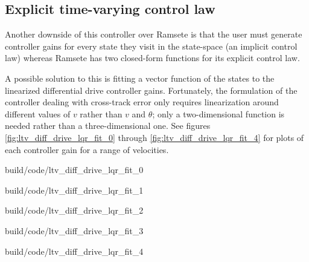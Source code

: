 \subsection{Explicit time-varying control law}

Another downside of this controller over Ramsete is that the user must generate
controller gains for every state they visit in the state-space (an implicit
control law) whereas Ramsete has two closed-form functions for its explicit
control law.

A possible solution to this is fitting a vector function of the states to the
linearized differential drive controller gains. Fortunately, the formulation of
the controller dealing with cross-track error only requires linearization around
different values of $v$ rather than $v$ and $\theta$; only a two-dimensional
function is needed rather than a three-dimensional one. See figures
\ref{fig:ltv_diff_drive_lqr_fit_0} through
\ref{fig:ltv_diff_drive_lqr_fit_4} for plots of each controller gain for
a range of velocities.

\begin{bookfigure}
  \begin{minisvg}{2}{build/code/ltv_diff_drive_lqr_fit_0}
    \caption{Linear time-varying differential drive controller LQR gain
      regression fit ($x$)}
    \label{fig:ltv_diff_drive_lqr_fit_0}
  \end{minisvg}
  \hfill
  \begin{minisvg}{2}{build/code/ltv_diff_drive_lqr_fit_1}
    \caption{Linear time-varying differential drive controller LQR gain fit
      regression fit ($y$)}
    \label{fig:ltv_diff_drive_lqr_fit_1}
  \end{minisvg}
  \hfill
  \begin{minisvg}{2}{build/code/ltv_diff_drive_lqr_fit_2}
    \caption{Linear time-varying differential drive controller LQR gain
      regression fit ($\theta$)}
    \label{fig:ltv_diff_drive_lqr_fit_2}
  \end{minisvg}
  \hfill
  \begin{minisvg}{2}{build/code/ltv_diff_drive_lqr_fit_3}
    \caption{Linear time-varying differential drive controller LQR gain
      regression fit ($v_l$)}
    \label{fig:ltv_diff_drive_lqr_fit_3}
  \end{minisvg}
  \hfill
  \begin{minisvg}{2}{build/code/ltv_diff_drive_lqr_fit_4}
    \caption{Linear time-varying differential drive controller LQR gain
      regression fit ($v_r$)}
    \label{fig:ltv_diff_drive_lqr_fit_4}
  \end{minisvg}
\end{bookfigure}


